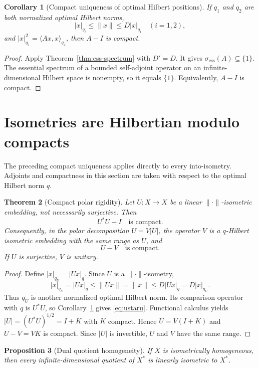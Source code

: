 \documentclass[11pt]{article}
\newtheorem{theorem}{Theorem}[section]
\newtheorem{proposition}[theorem]{Proposition}
\newtheorem{corollary}[theorem]{Corollary}
\theoremstyle{definition}
\begin{document}
\begin{corollary}[Compact uniqueness of optimal Hilbert positions]
\label{cor:compact-unique}
If $q_1$ and $q_2$ are both normalized optimal Hilbert norms,
\[
 |x|_{q_i}\leq\|x\|\leq D|x|_{q_i}\quad(i=1,2),
\]
and $|x|_{q_1}^2=\langle Ax,x\rangle_{q_2}$, then $A-I$ is compact.
\end{corollary}

\begin{proof}
Apply Theorem~\ref{thm:ess-spectrum} with $D'=D$.  It gives
$\sigma_{\mathrm{ess}}(A)\subseteq\{1\}$.  The essential spectrum of a
bounded self-adjoint operator on an infinite-dimensional Hilbert space is
nonempty, so it equals $\{1\}$.  Equivalently, $A-I$ is compact.
\end{proof}

\section{Isometries are Hilbertian modulo compacts}\label{sec:isometries}

The preceding compact uniqueness applies directly to every into-isometry.
Adjoints and compactness in this section are taken with respect to the optimal
Hilbert norm $q$.

\begin{theorem}[Compact polar rigidity]\label{thm:isom-compact}
Let $U:X\to X$ be a linear $\|\cdot\|$-isometric embedding, not necessarily
surjective.  Then
\begin{equation}\label{eq:ustaru}
 U^*U-I\quad\text{is compact}.
\end{equation}
Consequently, in the polar decomposition $U=V|U|$, the operator $V$ is a
$q$-Hilbert isometric embedding with the same range as $U$, and
\[
 U-V\quad\text{is compact}.
\]
If $U$ is surjective, $V$ is unitary.
\end{theorem}

\begin{proof}
Define $|x|_{q_U}=|Ux|_q$.  Since $U$ is a $\|\cdot\|$-isometry,
\[
 |x|_{q_U}=|Ux|_q\leq\|Ux\|=\|x\|
 \leq D|Ux|_q=D|x|_{q_U}.
\]
Thus $q_U$ is another normalized optimal Hilbert norm.  Its comparison
operator with $q$ is $U^*U$, so Corollary~\ref{cor:compact-unique} gives
\eqref{eq:ustaru}.  Functional calculus yields
$|U|=(U^*U)^{1/2}=I+K$ with $K$ compact.  Hence
$U=V(I+K)$ and $U-V=VK$ is compact.  Since $|U|$ is invertible, $U$ and $V$
have the same range.
\end{proof}

\begin{proposition}[Dual quotient homogeneity]\label{prop:dual-quotient}
If $X$ is isometrically homogeneous, then every infinite-dimensional quotient
of $X^*$ is linearly isometric to $X^*$.
\end{proposition}
\end{document}
